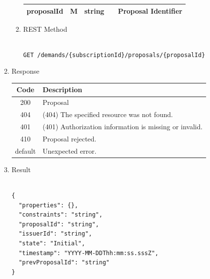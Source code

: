 \begin{enumerate}
\begin{enumerate}
\begin{table}[H]
\begin{center}
\begin{tabular}{|p{3cm}|l|p{3cm}|p{3cm}|p{4cm}|}
proposalId		& M & 	string			&		&	Proposal Identifier \\
\hline	

\end{tabular}
\end{center}

\end{table}

\item REST Method

\begin{tcolorbox}[boxrule=0pt, frame empty]
\begin{verbatim} 

GET /demands/{subscriptionId}/proposals/{proposalId}

\end{verbatim}
\end{tcolorbox}

\end{enumerate}

\item Response

\begin{table}[H]
\footnotesize

\begin{center}
\begin{tabular}{|c|l|} 
\hline
\rowcolor{lightgray}	Code 		& 	Description \\
\hline
200	 		&	Proposal  \\
\hline
404			&	(404) The specified resource was not found. \\
\hline
401			&	(401) Authorization information is missing or invalid. \\
\hline
410			&	Proposal rejected. \\
\hline
default		&	Unexpected error. \\
\hline
\end{tabular}
\end{center}

\end{table}

\item Result

\begin{tcolorbox}[boxrule=0pt, frame empty]
\begin{verbatim}

{
  "properties": {},
  "constraints": "string",
  "proposalId": "string",
  "issuerId": "string",
  "state": "Initial",
  "timestamp": "YYYY-MM-DDThh:mm:ss.sssZ",
  "prevProposalId": "string"
}


\end{verbatim}
\end{tcolorbox}
\end{enumerate}
